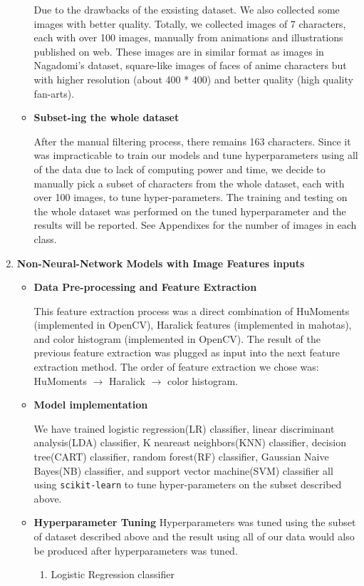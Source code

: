 \documentclass[11.5pt]{article}
\begin{document}
\begin{enumerate}
\begin{itemize}
            Due to the drawbacks of the exsisting dataset. We also collected some images with better quality.  Totally, we collected images of 7 characters, each with over 100 images, manually from animations and illustrations published on web.
            These images are in similar format as images in Nagadomi's dataset, square-like images of faces of anime characters but with higher resolution (about 400 * 400) and better quality (high quality fan-arts).
            \item \textbf{Subset-ing the whole dataset}

            After the manual filtering process, there remains 163 characters. Since it was impracticable to train our models and tune hyperparameters using all of the data due to lack of computing power and time, we decide to manually pick a subset of characters from the whole dataset, each with over 100 images, to tune hyper-parameters.
            The training and testing on the whole dataset was performed on the tuned hyperparameter and the results will be reported.
            See Appendixes for the number of images in each class.
        \end{itemize}
        \item \textbf{Non-Neural-Network Models with Image Features inputs}
        \begin{itemize}
            \item \textbf{Data Pre-processing and Feature Extraction}

            This feature extraction process was a direct combination of HuMoments (implemented in OpenCV), Haralick features (implemented in mahotas), and color histogram (implemented in OpenCV).
            The result of the previous feature extraction was plugged as input into the next feature extraction method.
            The order of feature extraction we chose was: HuMoments $\rightarrow$ Haralick $\rightarrow$ color histogram.
            \item \textbf{Model implementation}

            We have trained logistic regression(LR) classifier, linear discriminant analysis(LDA) classifier, K neareast neighbors(KNN) classifier, decision tree(CART) classifier, random forest(RF) classifier, Gaussian Naive Bayes(NB) classifier, and support vector machine(SVM) classifier all using \texttt{scikit-learn}\cite{scikit-learn} to tune hyper-parameters on the subset described above.
            \item \textbf{Hyperparameter Tuning}
            Hyperparameters was tuned using the subset of dataset described above and the result using all of our data would also be produced after hyperparameters was tuned.
            \begin{enumerate}
                \item Logistic Regression classifier


\end{enumerate}
\end{itemize}
\end{enumerate}
\end{document}
